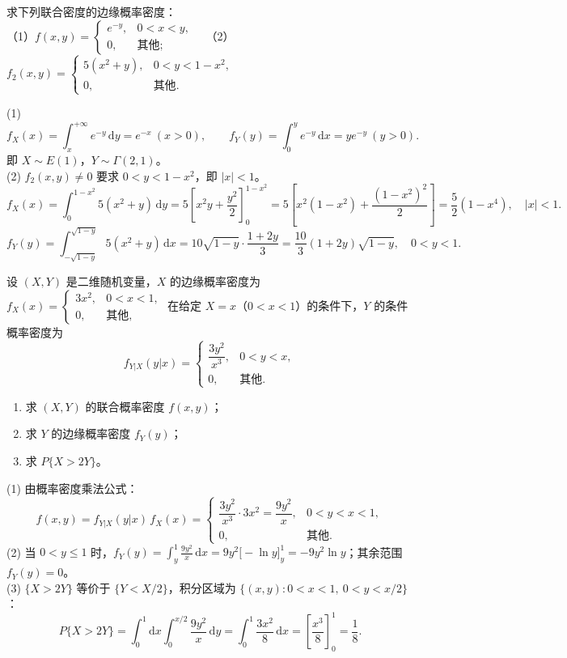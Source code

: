 \documentclass[lang=cn,11pt]{elegantbook}
\begin{document}
\begin{exercise}[两种边缘密度计算] \label{exer:3-c10}
求下列联合密度的边缘概率密度：\\
（1）$f(x,y) = \begin{cases} e^{-y}, & 0 < x < y, \\ 0, & \text{其他}; \end{cases}$~~（2）$f_2(x,y) = \begin{cases} 5(x^2+y), & 0 < y < 1-x^2, \\ 0, & \text{其他}. \end{cases}$
\end{exercise}
\begin{solution}
(1)
\[
f_X(x) = \int_x^{+\infty}e^{-y}\,\mathrm{d}y = e^{-x}\ (x > 0), \qquad f_Y(y) = \int_0^y e^{-y}\,\mathrm{d}x = ye^{-y}\ (y > 0).
\]
即 $X \sim E(1)$，$Y \sim \Gamma(2,1)$。\\
(2) $f_2(x,y) \neq 0$ 要求 $0 < y < 1-x^2$，即 $|x| < 1$。
\[
f_X(x) = \int_0^{1-x^2}5(x^2+y)\,\mathrm{d}y = 5\left[x^2y + \frac{y^2}{2}\right]_0^{1-x^2} = 5\left[x^2(1-x^2) + \frac{(1-x^2)^2}{2}\right] = \frac{5}{2}(1-x^4),\quad |x|<1.
\]
\[
f_Y(y) = \int_{-\sqrt{1-y}}^{\sqrt{1-y}}5(x^2+y)\,\mathrm{d}x = 10\sqrt{1-y}\cdot\frac{1+2y}{3} = \frac{10}{3}(1+2y)\sqrt{1-y},\quad 0<y<1.
\]
\end{solution}

\begin{exercise}\label{exer:3-4}
设 $(X,Y)$ 是二维随机变量，$X$ 的边缘概率密度为
\(
f_X(x) = \begin{cases} 3x^2, & 0 < x < 1, \\ 0, & \text{其他}, \end{cases}
\)
在给定 $X = x$（$0 < x < 1$）的条件下，$Y$ 的条件概率密度为
\[
f_{Y|X}(y|x) = \begin{cases} \dfrac{3y^2}{x^3}, & 0 < y < x, \\ 0, & \text{其他}. \end{cases}
\]
\begin{enumerate}
    \item[(1)] 求 $(X,Y)$ 的联合概率密度 $f(x,y)$；
    \item[(2)] 求 $Y$ 的边缘概率密度 $f_Y(y)$；
    \item[(3)] 求 $P\{X > 2Y\}$。
\end{enumerate}
\end{exercise}
\begin{solution}
(1) 由概率密度乘法公式：
\[
f(x,y) = f_{Y|X}(y|x)\,f_X(x) = \begin{cases} \dfrac{3y^2}{x^3} \cdot 3x^2 = \dfrac{9y^2}{x}, & 0 < y < x < 1, \\ 0, & \text{其他}. \end{cases}
\]
(2) 当 $0 < y \leqslant 1$ 时，$f_Y(y) = \displaystyle\int_y^1 \frac{9y^2}{x}\,\mathrm{d}x = 9y^2\bigl[-\ln y\bigr]_y^1 = -9y^2\ln y$；其余范围 $f_Y(y) = 0$。\\
(3) $\{X > 2Y\}$ 等价于 $\{Y < X/2\}$，积分区域为 $\{(x,y): 0 < x < 1,\ 0 < y < x/2\}$：
\[
P\{X > 2Y\} = \int_0^1\mathrm{d}x\int_0^{x/2}\frac{9y^2}{x}\,\mathrm{d}y = \int_0^1 \frac{3x^2}{8}\,\mathrm{d}x = \left[\frac{x^3}{8}\right]_0^1 = \frac{1}{8}.
\]
\end{solution}
\end{document}
